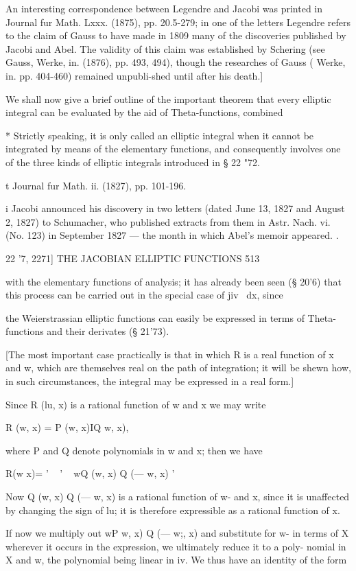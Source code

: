 An interesting correspondence between Legendre and Jacobi was printed
in Journal fur Math. Lxxx. (1875), pp. 20.5-279; in one of the letters
Legendre refers to the claim of Gauss to have made in 1809 many of the
discoveries published by Jacobi and Abel. The validity of this claim
was established by Schering (see Gauss, Werke, in. (1876), pp. 493,
494), though the researches of Gauss ( Werke, in. pp. 404-460)
remained unpubli-shed until after his death.]

We shall now give a brief outline of the important theorem that every
elliptic integral can be evaluated by the aid of Theta-functions,
combined

* Strictly speaking, it is only called an elliptic integral when it
cannot be integrated by means of the elementary functions, and
consequently involves one of the three kinds of elliptic integrals
introduced in § 22 "72.

t Journal fur Math. ii. (1827), pp. 101-196.

i Jacobi announced his discovery in two letters (dated June 13, 1827
and August 2, 1827) to Schumacher, who published extracts from them in
Astr. Nach. vi. (No. 123) in September 1827 — the month in which
Abel's memoir appeared. .

22 '7, 2271] THE JACOBIAN ELLIPTIC FUNCTIONS 513

with the elementary functions of analysis; it has already been seen
(§ 20'6) that this process can be carried out in the special case of
jiv~ dx, since

the Weierstrassian elliptic functions can easily be expressed in terms
of Theta-functions and their derivates (§ 21'73).

[The most important case practically is that in which R is a real
function of x and w, which are themselves real on the path of
integration; it will be shewn how, in such circumstances, the
integral may be expressed in a real form.]

Since R (lu, x) is a rational function of w and x we may write

R (w, x) = P (w, x)IQ w, x),

where P and Q denote polynomials in w and x; then we have

R(w x)= ' ~ ' ~ wQ (w, x) Q (— w, x) '

Now Q (w, x) Q (— w, x) is a rational function of w- and x, since it
is unaffected by changing the sign of lu; it is therefore expressible
as a rational function of x.

If now we multiply out wP w, x) Q (— w;, x) and substitute for w- in
terms of X wherever it occurs in the expression, we ultimately reduce
it to a poly- nomial in X and w, the polynomial being linear in iv. We
thus have an identity of the form

